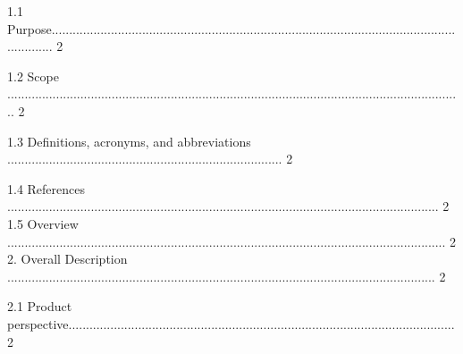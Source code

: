 \documentclass[10pt,draftclsnofoot,onecolumn]{IEEEtran}
\newcommand\tab[1][1cm]{\hspace*{#1}}
\begin{document}
   \tab 1.1 Purpose................................................................................................................................. 2\\
              \vspace{5mm}

   \tab 1.2 Scope ................................................................................................................................... 2\\
                 \vspace{5mm}

   \tab 1.3 Definitions, acronyms, and abbreviations ............................................................................... 2\\
                    \vspace{5mm}

   \tab 1.4 References ............................................................................................................................ 2\\
                 \vspace{5mm}
    \tab 1.5 Overview .............................................................................................................................. 2\\
                 \vspace{5mm}
2. Overall Description ........................................................................................................................... 2\\
                 \vspace{5mm}

\tab  2.1 Product perspective............................................................................................................... 2\\
                 \vspace{5mm}
\end{document}
